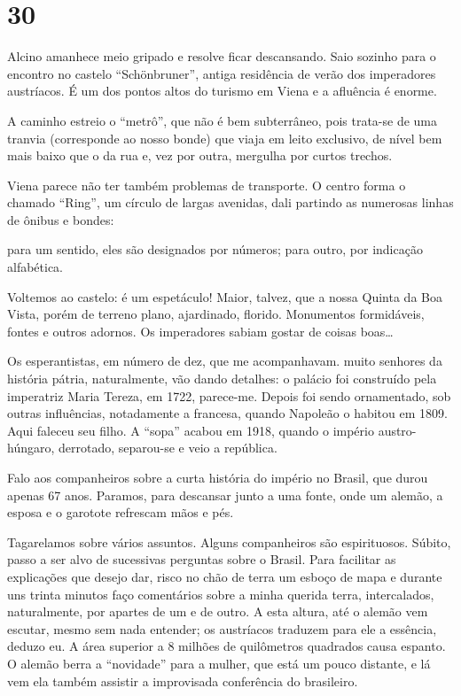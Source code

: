 \section*{30 \adfflatleafright {}}
Alcino amanhece meio gripado e resolve ficar descansando. Saio sozinho para o encontro no castelo “Schönbruner”, antiga residência de verão dos imperadores austríacos. É um dos pontos altos do turismo em Viena e a afluência é enorme.

A caminho estreio o “metrô”, que não é bem subterrâneo, pois trata-se de uma tranvia (corresponde ao nosso bonde) que viaja em leito exclusivo, de nível bem mais baixo que o da rua e, vez por outra, mergulha por curtos trechos.

Viena parece não ter também problemas de transporte. O centro forma o chamado “Ring”, um círculo de largas avenidas, dali partindo as numerosas linhas de ônibus e bondes:

para um sentido, eles são designados por números; para outro, por indicação alfabética.

Voltemos ao castelo: é um espetáculo! Maior, talvez, que a nossa Quinta da Boa Vista, porém de terreno plano, ajardinado, florido. Monumentos formidáveis, fontes e outros adornos. Os imperadores sabiam gostar de coisas boas\ldots

Os esperantistas, em número de dez, que me acompanhavam. muito senhores da história pátria, naturalmente, vão dando detalhes: o palácio foi construído pela imperatriz Maria Tereza, em 1722, parece-me. Depois foi sendo ornamentado, sob outras influências, notadamente a francesa, quando Napoleão o habitou em 1809. Aqui faleceu seu filho. A “sopa” acabou em 1918, quando o império austro-húngaro, derrotado, separou-se e veio a república.

Falo aos companheiros sobre a curta história do império no Brasil, que durou apenas 67 anos. Paramos, para descansar junto a uma fonte, onde um alemão, a esposa e o garotote refrescam mãos e pés.

Tagarelamos sobre vários assuntos. Alguns companheiros são espirituosos. Súbito, passo a ser alvo de sucessivas perguntas sobre o Brasil. Para facilitar as explicações que desejo dar, risco no chão de terra um esboço de mapa e durante uns trinta minutos faço comentários sobre a minha querida terra, intercalados, naturalmente, por apartes de um e de outro. A esta altura, até o alemão vem escutar, mesmo sem nada entender; os austríacos traduzem para ele a essência, deduzo eu. A área superior a 8 milhões de quilômetros quadrados causa espanto. O alemão berra a “novidade” para a mulher, que está um pouco distante, e lá vem ela também assistir a improvisada conferência do brasileiro.

